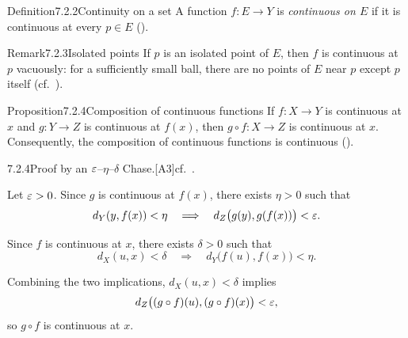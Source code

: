 \documentclass[main.tex]{subfiles}
\begin{document}
\begin{Obj}{Definition}{7.2.2}{Continuity on a set}
A function $f:E\to Y$ is \emph{continuous on $E$} if it is continuous at every $p\in E$
().
\end{Obj}

\begin{ObjL}{Remark}{7.2.3}{Isolated points}
If $p$ is an isolated point of $E$, then $f$ is continuous at $p$ vacuously: for a sufficiently
small ball, there are no points of $E$ near $p$ except $p$ itself (cf.\ ).
\end{ObjL}

\begin{Obj}{Proposition}{7.2.4}{Composition of continuous functions}
If $f:X\to Y$ is continuous at $x$ and $g:Y\to Z$ is continuous at $f(x)$, then
$g\circ f:X\to Z$ is continuous at $x$. Consequently, the composition of continuous functions is
continuous ().
\end{Obj}
\begin{Prf}{7.2.4}{Proof by an $\varepsilon$--$\eta$--$\delta$ Chase.}{[A3]\quad cf.\ .}
\item Let $\varepsilon>0$. Since $g$ is continuous at $f(x)$, there exists $\eta>0$ such that
  \[
    d_Y(y,f(x))<\eta
    \quad\Longrightarrow\quad
    d_Z\bigl(g(y),g(f(x))\bigr)<\varepsilon .
  \]
\item Since $f$ is continuous at $x$, there exists $\delta>0$ such that
  \[
    d_X(u,x)<\delta
    \quad\Longrightarrow\quad
    d_Y\bigl(f(u),f(x)\bigr)<\eta .
  \]
\item Combining the two implications, $d_X(u,x)<\delta$ implies
  \[
    d_Z\bigl((g\circ f)(u),(g\circ f)(x)\bigr)<\varepsilon ,
  \]
  so $g\circ f$ is continuous at $x$.
\end{Prf}
\end{document}
